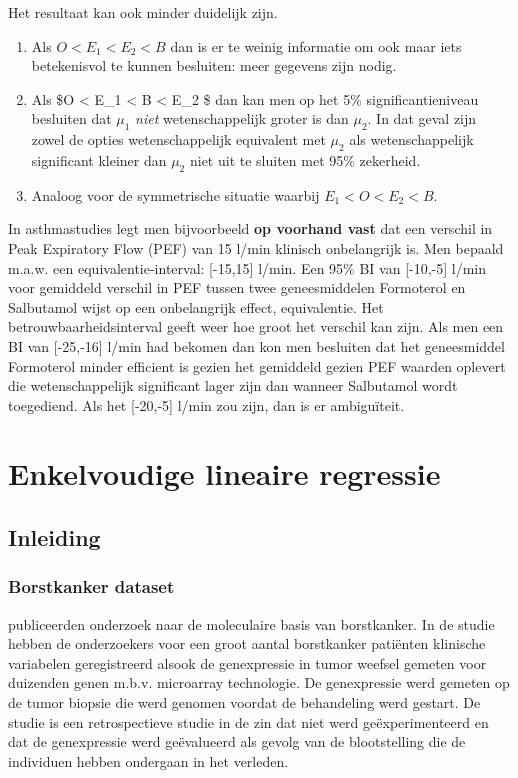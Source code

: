 \documentclass[12pt,dutch,coursenotes]{book}
\providecommand{\tightlist}{%
  \setlength{\itemsep}{0pt}\setlength{\parskip}{0pt}}
\theoremstyle{definition}
\theoremstyle{definition}
\theoremstyle{definition}
\theoremstyle{remark}
\begin{document}
Het resultaat kan ook minder duidelijk zijn.

\begin{enumerate}
\def\labelenumi{\arabic{enumi}.}
\tightlist
\item
  Als \(O < E_1 < E_2 < B\) dan is er te weinig informatie om ook maar
  iets betekenisvol te kunnen besluiten: meer gegevens zijn nodig.
\item
  Als \$O \textless{} E\_1 \textless{} B \textless{} E\_2 \$ dan kan men
  op het 5\% significantieniveau besluiten dat \(\mu_1\) \emph{niet}
  wetenschappelijk groter is dan \(\mu_2\). In dat geval zijn zowel de
  opties wetenschappelijk equivalent met \(\mu_2\) als wetenschappelijk
  significant kleiner dan \(\mu_2\) niet uit te sluiten met 95\%
  zekerheid.
\item
  Analoog voor de symmetrische situatie waarbij \(E_1 < O < E_2 < B.\)
\end{enumerate}

In asthmastudies legt men bijvoorbeeld \textbf{op voorhand vast} dat een
verschil in Peak Expiratory Flow (PEF) van 15 l/min klinisch
onbelangrijk is. Men bepaald m.a.w. een equivalentie-interval:
{[}-15,15{]} l/min. Een 95\% BI van {[}-10,-5{]} l/min voor gemiddeld
verschil in PEF tussen twee geneesmiddelen Formoterol en Salbutamol
wijst op een onbelangrijk effect, equivalentie. Het
betrouwbaarheidsinterval geeft weer hoe groot het verschil kan zijn. Als
men een BI van {[}-25,-16{]} l/min had bekomen dan kon men besluiten dat
het geneesmiddel Formoterol minder efficient is gezien het gemiddeld
gezien PEF waarden oplevert die wetenschappelijk significant lager zijn
dan wanneer Salbutamol wordt toegediend. Als het {[}-20,-5{]} l/min zou
zijn, dan is er ambiguïteit.

\chapter{Enkelvoudige lineaire regressie}\label{chap:linReg}

\section{Inleiding}\label{inleiding-4}

\subsection{Borstkanker dataset}\label{borstkanker-dataset}

\citet{sotiriou2006} publiceerden onderzoek naar de moleculaire basis
van borstkanker. In de studie hebben de onderzoekers voor een groot
aantal borstkanker patiënten klinische variabelen geregistreerd alsook
de genexpressie in tumor weefsel gemeten voor duizenden genen m.b.v.
microarray technologie. De genexpressie werd gemeten op de tumor biopsie
die werd genomen voordat de behandeling werd gestart. De studie is een
retrospectieve studie in de zin dat niet werd geëxperimenteerd en dat de
genexpressie werd geëvalueerd als gevolg van de blootstelling die de
individuen hebben ondergaan in het verleden.
\end{document}
